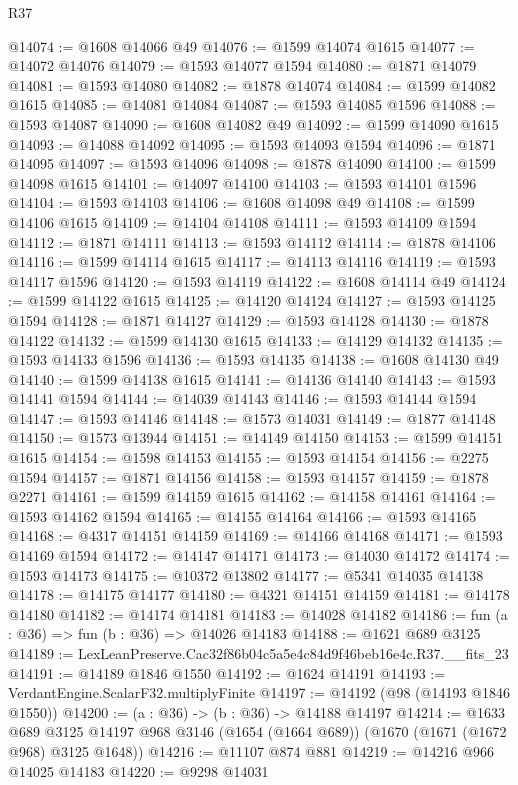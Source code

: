 \begin{lexlean}{R37}
\begin{coremodule}
@14074 := @1608 @14066 @49
@14076 := @1599 @14074 @1615
@14077 := @14072 @14076
@14079 := @1593 @14077 @1594
@14080 := @1871 @14079
@14081 := @1593 @14080
@14082 := @1878 @14074
@14084 := @1599 @14082 @1615
@14085 := @14081 @14084
@14087 := @1593 @14085 @1596
@14088 := @1593 @14087
@14090 := @1608 @14082 @49
@14092 := @1599 @14090 @1615
@14093 := @14088 @14092
@14095 := @1593 @14093 @1594
@14096 := @1871 @14095
@14097 := @1593 @14096
@14098 := @1878 @14090
@14100 := @1599 @14098 @1615
@14101 := @14097 @14100
@14103 := @1593 @14101 @1596
@14104 := @1593 @14103
@14106 := @1608 @14098 @49
@14108 := @1599 @14106 @1615
@14109 := @14104 @14108
@14111 := @1593 @14109 @1594
@14112 := @1871 @14111
@14113 := @1593 @14112
@14114 := @1878 @14106
@14116 := @1599 @14114 @1615
@14117 := @14113 @14116
@14119 := @1593 @14117 @1596
@14120 := @1593 @14119
@14122 := @1608 @14114 @49
@14124 := @1599 @14122 @1615
@14125 := @14120 @14124
@14127 := @1593 @14125 @1594
@14128 := @1871 @14127
@14129 := @1593 @14128
@14130 := @1878 @14122
@14132 := @1599 @14130 @1615
@14133 := @14129 @14132
@14135 := @1593 @14133 @1596
@14136 := @1593 @14135
@14138 := @1608 @14130 @49
@14140 := @1599 @14138 @1615
@14141 := @14136 @14140
@14143 := @1593 @14141 @1594
@14144 := @14039 @14143
@14146 := @1593 @14144 @1594
@14147 := @1593 @14146
@14148 := @1573 @14031
@14149 := @1877 @14148
@14150 := @1573 @13944
@14151 := @14149 @14150
@14153 := @1599 @14151 @1615
@14154 := @1598 @14153
@14155 := @1593 @14154
@14156 := @2275 @1594
@14157 := @1871 @14156
@14158 := @1593 @14157
@14159 := @1878 @2271
@14161 := @1599 @14159 @1615
@14162 := @14158 @14161
@14164 := @1593 @14162 @1594
@14165 := @14155 @14164
@14166 := @1593 @14165
@14168 := @4317 @14151 @14159
@14169 := @14166 @14168
@14171 := @1593 @14169 @1594
@14172 := @14147 @14171
@14173 := @14030 @14172
@14174 := @1593 @14173
@14175 := @10372 @13802
@14177 := @5341 @14035 @14138
@14178 := @14175 @14177
@14180 := @4321 @14151 @14159
@14181 := @14178 @14180
@14182 := @14174 @14181
@14183 := @14028 @14182
@14186 := fun (a : @36) => fun (b : @36) => @14026 @14183
@14188 := @1621 @689 @3125
@14189 := LexLeanPreserve.Cac32f86b04c5a5e4c84d9f46beb16e4c.R37.__fits_23
@14191 := @14189 @1846 @1550
@14192 := @1624 @14191
@14193 := VerdantEngine.ScalarF32.multiplyFinite
@14197 := @14192 (@98 (@14193 @1846 @1550))
@14200 := (a : @36) -> (b : @36) -> @14188 @14197
@14214 := @1633
    @689
    @3125
    @14197
    @968
    @3146
    (@1654 (@1664 @689))
    (@1670 (@1671 (@1672 @968) @3125 @1648))
@14216 := @11107 @874 @881
@14219 := @14216 @966 @14025 @14183
@14220 := @9298 @14031

\end{coremodule}
\end{lexlean}

